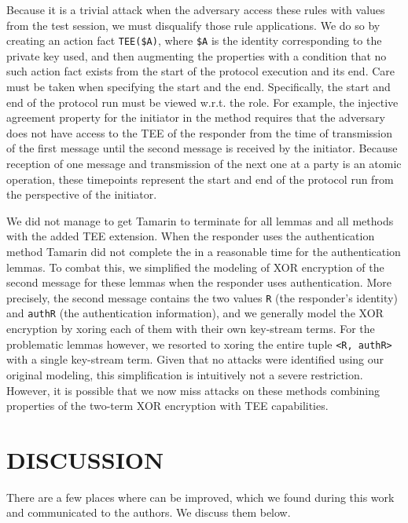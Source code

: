 \documentclass[runningheads]{llncs}
\begin{document}
Because it is a trivial attack when the adversary access these rules with values
from the test session, we must disqualify those rule applications.
%
We do so by creating an action fact \verb|TEE($A)|, where \verb|$A| is the
identity corresponding to the private key used, and then augmenting the
properties with a condition that no such action fact exists from the start of
the protocol execution and its end.
%
Care must be taken when specifying the start and the end.
%
Specifically, the start and end of the protocol run must be viewed w.r.t. the
role.
%
For example, the injective agreement property for the initiator in
the \mSigSig{} method requires that the adversary does not have access to the
TEE of the
responder from the time of transmission of the first message until the second
message is received by the initiator.
%
Because reception of one message and transmission of the next one at a party
is an atomic operation, these timepoints represent the start and end of the
protocol run from the perspective of the initiator.
%

We did not manage to get Tamarin to terminate for all lemmas and all methods
with the added TEE extension.
%
When the responder uses the \mStat{} authentication method Tamarin did not
complete the in a reasonable time for the authentication lemmas.
%
To combat this, we simplified the modeling of XOR encryption of the second
message for these lemmas when the responder uses \mStat{} authentication.
%
More precisely, the second message contains the two values \verb|R| (the
responder's identity) and
\verb|authR| (the authentication information), and we generally model the
XOR encryption by xoring each of them with their own key-stream terms.
%
For the problematic lemmas however, we resorted to xoring the entire tuple
\verb|<R, authR>| with a single key-stream term.
%
Given that no attacks were identified using our original modeling, this
simplification is intuitively not a severe restriction.
%
However, it is possible that we now miss attacks on these methods
combining properties of the two-term XOR encryption with TEE capabilities.
%

\section{\uppercase{Discussion}}
\label{sec:discussion}
There are a few places where \mEdhoc{} can be improved,
which we found during this work and communicated to the authors.
%
We discuss them below.
%
\end{document}
